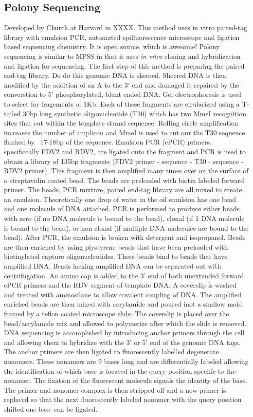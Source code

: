 \documentclass{report}\usepackage[]{graphicx}\usepackage[]{color}
\begin{document}
\subsection*{Polony Sequencing}
Developed by Church at Harvard in XXXX. This method uses in vitro paired-tag library with emulsion PCR, 
automated epifluorescence microscope and ligation based sequencing chemistry. It is open source, 
which is awesome! Polony sequencing is similar to MPSS in that it uses \textit{in vitro} cloning and hybridization
and ligation for sequencing. 
The first step of this method is preparing the paired end-tag library. Do do this genomic DNA is sheered.
Sheered DNA is then modified by the addition of an A to the 3' end and damaged is 
repaired by the converstion to 5' phosphorylated, blunt ended DNA. Gel electrophoresis is used to select for
fragements of 1Kb. Each of these fragments are cirularized using a T-tailed 30bp long synthetic 
oligonucleotide (T30) which has two MmeI recognition sites that cut within the template strand sequence.
Rolling circle amplification increases the number of amplicon and MmeI is used to cut our the T30 sequence
flanked by ~17-18bp of the sequence. Emulsion PCR (ePCR) primers, specificcally FDV2 and RDV2, are
ligated onto the fragment and PCR is used to obtain a library of 135bp fragments (FDV2 primer - sequence - 
T30 - sequence - RDV2 primer). This fragment is then amplified many times over on the surface of a streptavidin
coated bead. The beads are preloaded with biotin labeled forward primer. The beads, PCR mixture, paired end-tag
library are all mixed to create an emulsion. Theoretically one drop of water in the oil emulsion has one bead
and one molecule of DNA attached. PCR is performed to produce either beads with zero (if no DNA molecule is 
bound to the bead), clonal (if 1 DNA molecule is bound to the bead), or non-clonal (if multiple DNA molecules are 
bound to the bead). After PCR, the emulsion is broken with detergent and isopropanol. Beads are then enriched 
by using plystyrene beads that have been preloaded with biotinylated capture oligonucleotides. These beads 
bind to beads that have amplified DNA. Beads lacking amplified DNA can be separated out with centrifugation.
An amino cap is added to the 3’ end of both unextended forward ePCR primers and the RDV segment of template DNA. 
A coverslip is washed and treated with aminosilane to allow covalent coupling of DNA. The amplified enriched beads are 
then mixed with acrylamide and poured inot a shallow mold framed by a teflon coated microscope slide. The coverslip
is placed over the bead/acrylamide mix and allowed to polymerize after which the slide is removed. DNA sequencing
is accomplished by introducing anchor primers through the cell and allowing them to hybridize with the 3' or 5' end of 
the genomic DNA tags. The anchor primers are then ligated to fluorescently labelled degenerate nonomers. 
These nonamers are 9 bases long and are differentially
labeled allowing the identification of which base is located in the query position specific to the nonamer. 
The fixation of the fluorescent molecule signals the identity of the base. 
The primer and nonomer complex is then stripped off and a new primer is replaced so that the next fluorescently 
labeled nonomer with the query position shifted one base can be ligated. 
\end{document}
